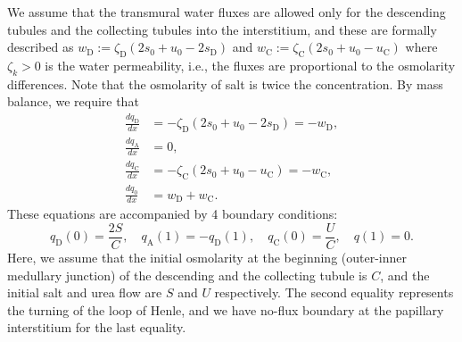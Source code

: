 \documentclass{article}
\numberwithin{equation}{section} %
\begin{document}
We assume that the transmural water fluxes are allowed only for the descending tubules and the collecting tubules into the interstitium, and these are formally described as $w_\mathrm{D}:=\zeta_\mathrm{D}(2s_0+u_0-2s_\mathrm{D})$ and $w_\mathrm{C}:=\zeta_\mathrm{C}(2s_0+u_0 - u_\mathrm{C})$ where $\zeta_k>0$ is the water permeability, i.e., the fluxes are proportional to the osmolarity differences.
Note that the osmolarity of salt is twice the concentration.
By mass balance, we require that
\begin{align}
    \frac{dq_\mathrm{D}}{dx} &= -\zeta_\mathrm{D}\left( 2s_0+u_0 - 2s_\mathrm{D} \right) = -w_\mathrm{D},\label{eq:q_D_eq}\\
    \frac{dq_\mathrm{A}}{dx} &= 0,\label{eq:q_A_eq}\\
    \frac{dq_\mathrm{C}}{dx} &= -\zeta_\mathrm{C}\left( 2s_0+u_0 - u_\mathrm{C} \right) = -w_\mathrm{C},\label{eq:q_C_eq}\\
    \frac{dq_0}{dx} &= w_\mathrm{D}+w_\mathrm{C}.\label{eq:q_0_eq}
\end{align}
These equations are accompanied by 4 boundary conditions:
\begin{equation}\label{eq:q_bdry}
    q_\mathrm{D}(0) = \frac{2S}{C},\quad q_\mathrm{A}(1) = -q_\mathrm{D}(1),\quad q_\mathrm{C}(0) = \frac{U}{C},\quad q(1) = 0.
\end{equation}
Here, we assume that the initial osmolarity at the beginning (outer-inner medullary junction) of the descending and the collecting tubule is $C$, and the initial salt and urea flow are $S$ and $U$ respectively.
The second equality represents the turning of the loop of Henle, and we have no-flux boundary at the papillary interstitium for the last equality.
\end{document}
